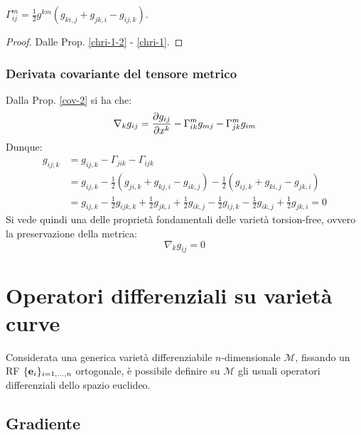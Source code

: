 \begin{proposition}\label{levi-civita}
	$ \Gamma^m_{ij} = \frac{1}{2} g^{km} \left( g_{ki,j} + g_{jk,i} - g_{ij,k} \right) $.
\end{proposition}
\begin{proof}
	Dalle Prop. \ref{chri-1-2} - \ref{chri-1}.
\end{proof}

\subsubsection{Derivata covariante del tensore metrico}

Dalla Prop. \ref{cov-2} si ha che:
\begin{equation}
	\nabla_k g_{ij} = \frac{\partial g_{ij}}{\partial x^k} - \Gamma^m_{ik} g_{mj} - \Gamma^m_{jk} g_{im}
	\label{eq:4.15}
\end{equation}
Dunque:
\begin{equation*}
	\begin{split}
		g_{ij;k}
		&= g_{ij,k} - \Gamma_{jik} - \Gamma_{ijk}\\
		&= g_{ij,k} - \frac{1}{2} \left( g_{ji,k} + g_{kj,i} - g_{ik,j} \right) - \frac{1}{2} \left( g_{ij,k} + g_{ki,j} - g_{jk,i} \right)\\
		&= g_{ij,k} - \frac{1}{2} g_{ijk,k} + \frac{1}{2} g_{jk,i} + \frac{1}{2} g_{ik,j} - \frac{1}{2} g_{ij,k} - \frac{1}{2} g_{ik,j} + \frac{1}{2} g_{jk,i} = 0
	\end{split}
\end{equation*}
Si vede quindi una delle proprietà fondamentali delle varietà torsion-free, ovvero la preservazione della metrica:
\begin{equation}
	\nabla_k g_{ij} = 0
	\label{eq:4.16}
\end{equation}

\section{Operatori differenziali su varietà curve}

Considerata una generica varietà differenziabile $ n $-dimensionale $ \mathcal{M} $, fissando un RF $ \{\mathbf{e}_i\}_{i = 1, \dots, n} $ ortogonale, è possibile definire su $ \mathcal{M} $ gli usuali operatori differenziali dello spazio euclideo.

\subsection{Gradiente}

